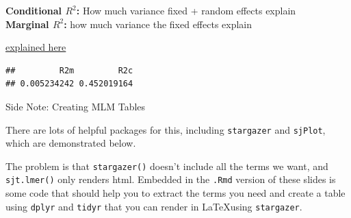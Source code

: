 \begin{frame}[fragile]

\small
\textbf{Conditional $R^2$:} How much variance fixed + random effects
explain\\
\textbf{Marginal $R^2$:} how much variance the fixed effects explain

\href{https://jonlefcheck.net/2013/03/13/r2-for-linear-mixed-effects-models/}{explained
here}

\begin{Shaded}
\begin{Highlighting}[]
\OperatorTok{::}
\end{Highlighting}
\end{Shaded}

\begin{verbatim}
##         R2m         R2c 
## 0.005234242 0.452019164
\end{verbatim}

\normalsize

\end{frame}

\begin{frame}[fragile]{Side Note: Creating MLM Tables}

There are lots of helpful packages for this, including
\texttt{stargazer} and \texttt{sjPlot}, which are demonstrated below.\\
\small

\begin{Shaded}
\begin{Highlighting}[]
\OperatorTok{::}
\OperatorTok{::}
\end{Highlighting}
\end{Shaded}

\normalsize

The problem is that \texttt{stargazer()} doesn't include all the terms
we want, and \texttt{sjt.lmer()} only renders html. Embedded in the
\texttt{.Rmd} version of these slides is some code that should help you
to extract the terms you need and create a table using \texttt{dplyr}
and \texttt{tidyr} that you can render in \LaTeX using
\texttt{stargazer}.

\end{frame}

